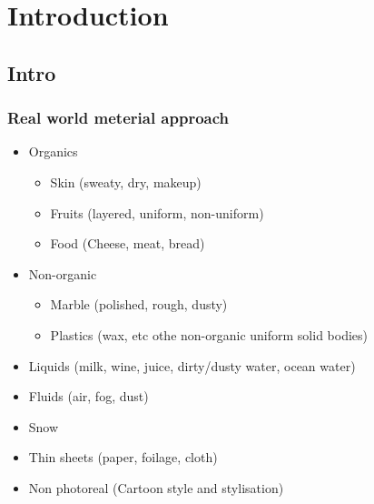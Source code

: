 \chapter{Introduction}
\label{chapter:Introduction}

\section{Intro}

\subsection{Real world meterial approach}
\begin{itemize}
    \item Organics
    \begin{itemize}
      \item Skin (sweaty, dry, makeup)
      \item Fruits (layered, uniform, non-uniform)
      \item Food (Cheese, meat, bread)
    \end{itemize}
    \item Non-organic
    \begin{itemize}
      \item Marble (polished, rough, dusty)
      \item Plastics (wax, etc othe non-organic uniform solid bodies)
    \end{itemize}
    \item Liquids (milk, wine, juice, dirty/dusty water, ocean water)
    \item Fluids (air, fog, dust)
    \item Snow
    \item Thin sheets (paper, foilage, cloth)
    \item Non photoreal (Cartoon style and stylisation)
\end{itemize}

